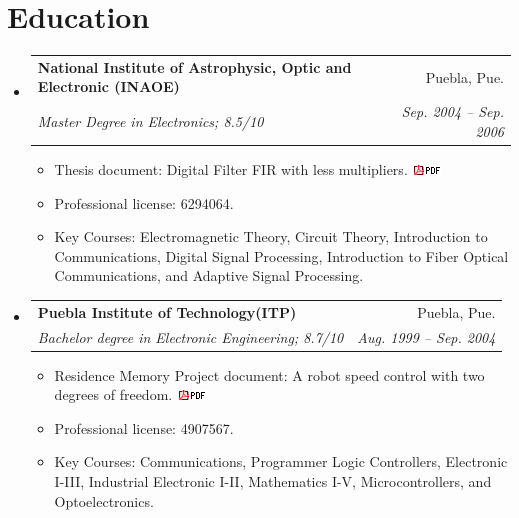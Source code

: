 \documentclass[10pt]{article}
\makeatletter
\newcommand{\resitem}[1]{\item #1 \vspace{-2pt}}
\newcommand{\ressubheading}[4]{
\begin{tabular*}{6.5in}{l@{\extracolsep{\fill}}r}
		\textbf{#1} & #2 \\
		\textit{#3} & \textit{#4} \\
\end{tabular*}\vspace{-6pt}}
\makeatother
\begin{document}
     
    \section*{Education}
	\begin{itemize}
		\item	
				\ressubheading{National Institute of Astrophysic, Optic and Electronic (INAOE)}{Puebla, Pue.}{{Master Degree in Electronics}; {8.5/10}   }
			{Sep. 2004 -- Sep. 2006}
			{ \footnotesize
				\begin{itemize}
\resitem{Thesis document:  Digital Filter FIR with less multipliers. 
\href{https://sites.google.com/site/perezxochicale/docs/MScThesis.pdf}{\includegraphics[scale=.5]{icon_pdf_small}}}



\resitem{Professional license: 6294064.}
					\resitem{Key Courses: 
					Electromagnetic Theory, Circuit Theory, Introduction to Communications, Digital Signal Processing,
					Introduction to Fiber Optical Communications, and Adaptive Signal Processing. }
				\end{itemize}
				}

		\item	
		\ressubheading{Puebla Institute of Technology(ITP)}{Puebla, Pue.}{{Bachelor degree in Electronic Engineering}; {8.7/10}   }
			{Aug. 1999 -- Sep. 2004}

			{ \footnotesize
				\begin{itemize}
\resitem{Residence Memory Project document:  A robot speed control with two degrees of freedom. 
\href{https://sites.google.com/site/perezxochicale/docs/BachelorProject.pdf}
{\includegraphics[scale=.5]{icon_pdf_small}}}
\resitem{Professional license: 4907567.}
					\resitem{Key Courses: 
					Communications, Programmer Logic Controllers, Electronic I-III, Industrial Electronic I-II, Mathematics I-V, Microcontrollers,
					and Optoelectronics.}
				\end{itemize}
				} 
	\end{itemize} %
\end{document}
